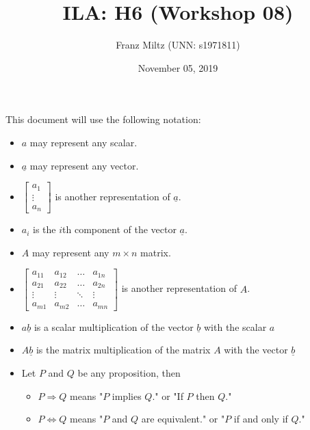 \documentclass{article}
\title{ILA: H6 (Workshop 08)}
\author{Franz Miltz (UNN: s1971811)}
\date{November 05, 2019}
\renewcommand{\vec}{\underline}
\begin{document}
\maketitle
This document will use the following notation:
\begin{itemize}
    \item $a$ may represent any scalar.
    \item $\vec{a}$ may represent any vector.
    \item $\begin{bmatrix}
        a_1\\
        \vdots\\
        a_n
    \end{bmatrix}$ is another representation of $\vec a$. 
    \item $a_i$ is the $i$th component of the vector $\vec a$.
    \item $A$ may represent any $m\times n$ matrix.
    \item $\begin{bmatrix}
        a_{11} & a_{12}&\dots &a_{1n}\\
        a_{21} & a_{22}&\dots &a_{2n}\\
        \vdots & \vdots & \ddots & \vdots\\
        a_{m1} & a_{m2} &\dots &a_{mn}
    \end{bmatrix}$ is another representation of $A$.
    \item $a\vec{b}$ is a scalar multiplication of the vector $\vec{b}$ with the scalar $a$
    \item $A\vec b$ is the matrix multiplication of the matrix $A$ with the vector $\vec b$
    \item Let $P$ and $Q$ be any proposition, then
    \begin{itemize}
        \item $P\Rightarrow Q$ means "$P$ implies $Q$." or "If $P$ then $Q$."
        \item $P\Leftrightarrow Q$ means "$P$ and $Q$ are equivalent." or "$P$ if and only if $Q$."
    \end{itemize}
\end{itemize}
\end{document}
